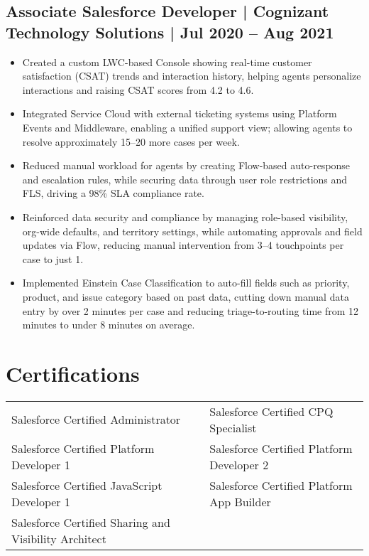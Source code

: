 \documentclass[a4paper,11pt]{article}
\begin{document}
\subsection{Associate Salesforce Developer | Cognizant Technology Solutions | Jul 2020 – Aug 2021}
\begin{itemize}
    \item Created a custom LWC-based Console showing real-time customer satisfaction (CSAT) trends and interaction history, helping agents personalize interactions and raising CSAT scores from 4.2 to 4.6.
    \item Integrated Service Cloud with external ticketing systems using Platform Events and Middleware, enabling a unified support view; allowing agents to resolve approximately 15–20 more cases per week.
    \item Reduced manual workload for agents by creating Flow-based auto-response and escalation rules, while securing data through user role restrictions and FLS, driving a 98\% SLA compliance rate.
    \item Reinforced data security and compliance by managing role-based visibility, org-wide defaults, and territory settings, while automating approvals and field updates via Flow, reducing manual intervention from 3–4 touchpoints per case to just 1.
    \item Implemented Einstein Case Classification to auto-fill fields such as priority, product, and issue category based on past data, cutting down manual data entry by over 2 minutes per case and reducing triage-to-routing time from 12 minutes to under 8 minutes on average.
\end{itemize}

\section*{Certifications}
\begin{tabular}{@{}p{} p{}@{}}
Salesforce Certified Administrator & Salesforce Certified CPQ Specialist \\
Salesforce Certified Platform Developer 1 & Salesforce Certified Platform Developer 2 \\
Salesforce Certified JavaScript Developer 1 & Salesforce Certified Platform App Builder \\
Salesforce Certified Sharing and Visibility Architect & \\
\end{tabular}
\end{document}
